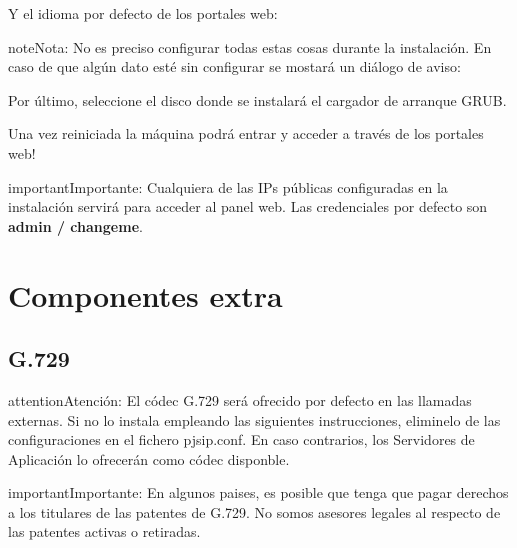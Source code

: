 \documentclass[letterpaper,10pt,spanish]{sphinxmanual}
\begin{document}
Y el idioma por defecto de los portales web:

\noindent{}

\begin{notice}{note}{Nota:}
No es preciso configurar todas estas cosas durante la instalación. En caso de que algún dato esté sin configurar se mostará un diálogo de aviso:
\end{notice}

\noindent{}

Por último, seleccione el disco donde se instalará el cargador de arranque GRUB.

\noindent{}

Una vez reiniciada la máquina podrá entrar y acceder a través de los portales web!

\begin{notice}{important}{Importante:}
Cualquiera de las IPs públicas configuradas en la instalación servirá para acceder al panel web. Las credenciales por defecto son \textbf{admin / changeme}.
\end{notice}


\section{Componentes extra}
\label{basic_concepts/installation/extra_components::doc}\label{basic_concepts/installation/extra_components:extra-components}

\subsection{G.729}
\label{basic_concepts/installation/extra_components:g-729}
\begin{notice}{attention}{Atención:}
El códec G.729 será ofrecido por defecto en las llamadas externas. Si no lo instala empleando las siguientes instrucciones, eliminelo de las configuraciones en el fichero pjsip.conf. En caso contrarios, los Servidores de Aplicación lo ofrecerán como códec disponble.
\end{notice}

\begin{notice}{important}{Importante:}
En algunos paises, es posible que tenga que pagar derechos a los titulares de las patentes de G.729. No somos asesores legales al respecto de las patentes activas o retiradas.
\end{notice}
\end{document}
